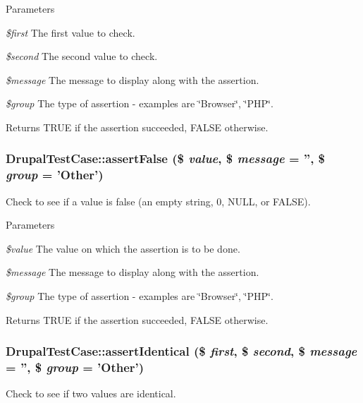 \begin{DoxyParams}{Parameters}
\item[{\em \$first}]The first value to check. \item[{\em \$second}]The second value to check. \item[{\em \$message}]The message to display along with the assertion. \item[{\em \$group}]The type of assertion -\/ examples are \char`\"{}Browser\char`\"{}, \char`\"{}PHP\char`\"{}. \end{DoxyParams}
\begin{DoxyReturn}{Returns}
TRUE if the assertion succeeded, FALSE otherwise. 
\end{DoxyReturn}
\hypertarget{class_drupal_test_case_a8dbe449ccfc164f64d07a42337e51747}{
\subsubsection[{assertFalse}]{\setlength{\rightskip}{0pt plus 5cm}DrupalTestCase::assertFalse (\$ {\em value}, \/  \$ {\em message} = {\ttfamily ''}, \/  \$ {\em group} = {\ttfamily 'Other'})}}
\label{class_drupal_test_case_a8dbe449ccfc164f64d07a42337e51747}
Check to see if a value is false (an empty string, 0, NULL, or FALSE).


\begin{DoxyParams}{Parameters}
\item[{\em \$value}]The value on which the assertion is to be done. \item[{\em \$message}]The message to display along with the assertion. \item[{\em \$group}]The type of assertion -\/ examples are \char`\"{}Browser\char`\"{}, \char`\"{}PHP\char`\"{}. \end{DoxyParams}
\begin{DoxyReturn}{Returns}
TRUE if the assertion succeeded, FALSE otherwise. 
\end{DoxyReturn}
\hypertarget{class_drupal_test_case_afe08222abaa77bc367b110804c374298}{
\subsubsection[{assertIdentical}]{\setlength{\rightskip}{0pt plus 5cm}DrupalTestCase::assertIdentical (\$ {\em first}, \/  \$ {\em second}, \/  \$ {\em message} = {\ttfamily ''}, \/  \$ {\em group} = {\ttfamily 'Other'})}}
\label{class_drupal_test_case_afe08222abaa77bc367b110804c374298}
Check to see if two values are identical.



